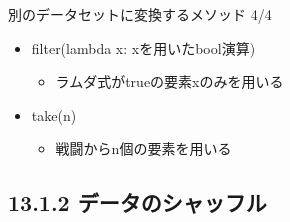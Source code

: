 \documentclass[aspectratio=169, dvipdfmx, 14pt, xcolor={svgnames,dvipsnames}, t]{beamer}
\begin{document}

\begin{frame}{別のデータセットに変換するメソッド 4/4}\label{ux5225ux306eux30c7ux30fcux30bfux30bbux30c3ux30c8ux306bux5909ux63dbux3059ux308bux30e1ux30bdux30c3ux30c9-44}

  \begin{itemize}
    \tightlist
    \item
          filter(lambda x: xを用いたbool演算)

          \begin{itemize}
            \tightlist
            \item
                  ラムダ式がtrueの要素xのみを用いる
          \end{itemize}
    \item
          take(n)

          \begin{itemize}
            \tightlist
            \item
                  戦闘からn個の要素を用いる
          \end{itemize}
  \end{itemize}

\end{frame}


\hypertarget{ux30c7ux30fcux30bfux306eux30b7ux30e3ux30c3ux30d5ux30eb}{%
  \subsection{13.1.2 データのシャッフル}\label{ux30c7ux30fcux30bfux306eux30b7ux30e3ux30c3ux30d5ux30eb}}

\end{document}
